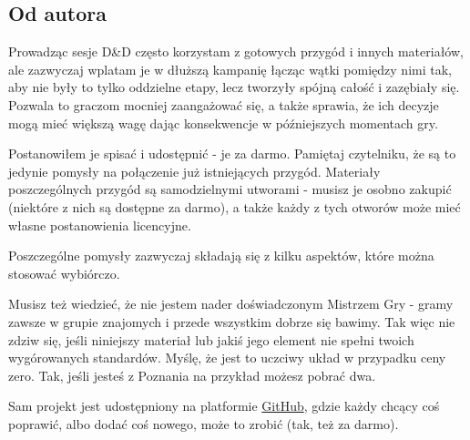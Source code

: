 \documentclass[letterpaper,twoside,twocolumn,openany,nodeprecatedcode]{dndbook}
\begin{document}
\tableofcontents

\mainmatter

\clearpage

\begin{onecolumn}
\section{Od autora}
Prowadząc sesje D\&D często korzystam z gotowych przygód i innych materiałów, ale zazwyczaj wplatam je w dłuższą
kampanię łącząc wątki pomiędzy nimi tak, aby nie były to tylko oddzielne etapy, lecz tworzyły spójną całość i zazębiały
się. Pozwala to graczom mocniej zaangażować się, a także sprawia, że ich decyzje mogą mieć większą wagę dając
konsekwencje w późniejszych momentach gry.
\par
Postanowiłem je spisać i udostępnić - je za darmo. Pamiętaj czytelniku, że są to jedynie pomysły na połączenie już
istniejących przygód. Materiały poszczególnych przygód są samodzielnymi utworami - musisz je osobno zakupić (niektóre z
nich są dostępne za darmo), a także każdy z tych otworów może mieć własne postanowienia licencyjne.
\par
Poszczególne pomysły zazwyczaj składają się z kilku aspektów, które można stosować wybiórczo.
\par
Musisz też wiedzieć, że nie jestem nader doświadczonym Mistrzem Gry - gramy zawsze w grupie znajomych i przede wszystkim
dobrze się bawimy. Tak więc nie zdziw się, jeśli niniejszy materiał lub jakiś jego element nie spełni twoich
wygórowanych standardów. Myślę, że jest to uczciwy układ w przypadku ceny zero. Tak, jeśli jesteś z Poznania na przykład
możesz pobrać dwa.
\par
Sam projekt jest udostępniony na platformie \href{https://github.com/rafalwrzeszcz/dnd-mashups}{GitHub}, gdzie każdy
chcący coś poprawić, albo dodać coś nowego, może to zrobić (tak, też za darmo).
\end{onecolumn}






\clearpage
\printbibliography[heading=bibintoc,title=Odnośniki]
\end{document}
